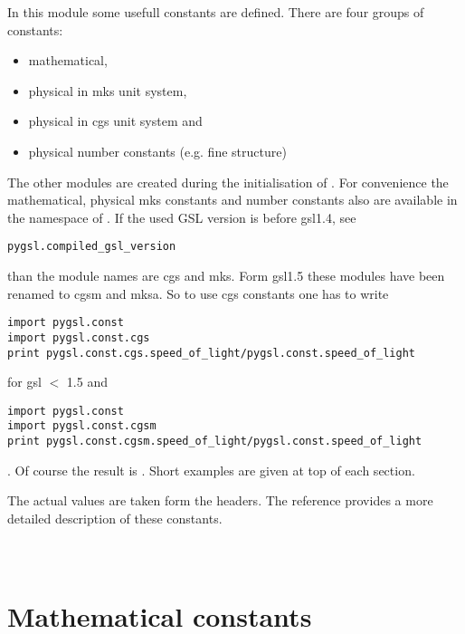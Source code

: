 
In this module some usefull constants are defined.  There are four groups of
constants:

\begin{itemize}
\item mathematical,
\item physical in mks unit system,
\item physical in cgs unit system and
\item physical number constants (e.g. fine structure)
\end{itemize}

The other modules are created during the initialisation of
.  For convenience the mathematical, physical mks
constants and number constants also are available in the namespace of
.  If the used GSL version is before gsl1.4, see
\begin{verbatim}
pygsl.compiled_gsl_version
\end{verbatim}
than the module names are cgs and mks. Form gsl1.5 these modules have been
renamed to cgsm and mksa. So to use cgs constants one has to write
\begin{verbatim}
import pygsl.const
import pygsl.const.cgs
print pygsl.const.cgs.speed_of_light/pygsl.const.speed_of_light
\end{verbatim}
for gsl $<$ 1.5 and
\begin{verbatim}
import pygsl.const
import pygsl.const.cgsm
print pygsl.const.cgsm.speed_of_light/pygsl.const.speed_of_light
\end{verbatim}.
Of course the result is .
Short examples are given at top of each section.

\begin{seealso}
  The actual values are taken form the \gsl{} headers.  The \GSL{} reference
  provides a more detailed description of these constants.
\end{seealso}

\section[\protect\module{pygsl.const.m} --- Mathematical constants]
{\protect{} \\ Mathematical constants} 
\label{cha:const-math-module}

